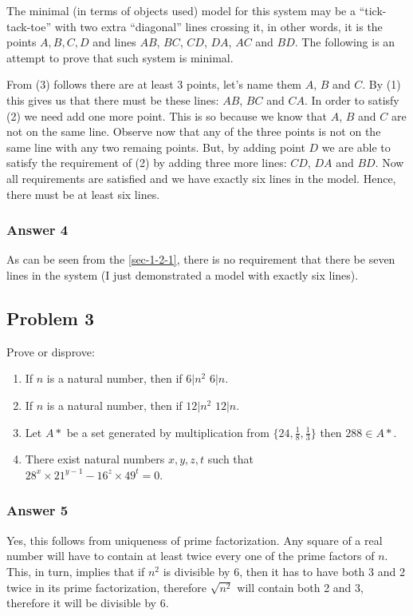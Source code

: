 \documentclass[11pt]{article}
\begin{document}
The minimal (in terms of objects used) model for this system may be
a ``tick-tack-toe'' with two extra ``diagonal'' lines crossing it, in
other words, it is the points $A, B, C, D$ and lines $AB$, $BC$, $CD$,
$DA$, $AC$ and $BD$.  The following is an attempt to prove that such
system is minimal.

From (3) follows there are at least 3 points, let's name them $A$,
$B$ and $C$.  By (1) this gives us that there must be these lines:
$AB$, $BC$ and $CA$.  In order to satisfy (2) we need add one more point.
This is so because we know that $A$, $B$ and $C$ are not on the same
line.  Observe now that any of the three points is not on the same
line with any two remaing points.  But, by adding point $D$ we are
able to satisfy the requirement of (2) by adding three more lines:
$CD$, $DA$ and $BD$.  Now all requirements are satisfied and we have
exactly six lines in the model.  Hence, there must be at least six
lines.
\subsubsection{Answer 4}
\label{sec-1-2-2}
As can be seen from the \ref{sec-1-2-1}, there is no requirement that there
be seven lines in the system (I just demonstrated a model with
exactly six lines).
\subsection{Problem 3}
\label{sec-1-3}
Prove or disprove:
\begin{enumerate}
\item If $n$ is a natural number, then if $6|n^2$ $6|n$.
\item If $n$ is a natural number, then if $12|n^2$ $12|n$.
\item Let $A*$ be a set generated by multiplication from 
      $\{24, \frac{1}{8}, \frac{1}{3}\}$ then ${288 \in A*}$.
\item There exist natural numbers $x,y,z,t$ such that \\
      ${28^x \times 21^{y-1} -16^z \times 49^t = 0}$.
\end{enumerate}

\subsubsection{Answer 5}
\label{sec-1-3-1}
Yes, this follows from uniqueness of prime factorization.  Any square
of a real number will have to contain at least twice every one of the
prime factors of $n$.  This, in turn, implies that if $n^2$ is divisible
by 6, then it has to have both 3 and 2 twice in its prime factorization,
therefore $\sqrt{n^2}$ will contain both 2 and 3, therefore it will be
divisible by 6.
\end{document}

